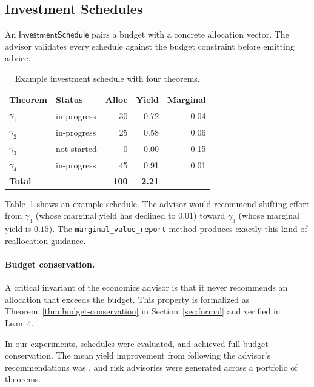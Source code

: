 \documentclass[11pt]{article}
\begin{document}
\subsection{Investment Schedules}\label{sec:schedules}

An $\mathsf{InvestmentSchedule}$ pairs a budget with a concrete
allocation vector.  The advisor validates every schedule against
the budget constraint before emitting advice.

\begin{table}[t]
\centering
\caption{Example investment schedule with four theorems.}
\label{tab:schedule-example}
\begin{tabular}{llrrr}
\hline
\textbf{Theorem} & \textbf{Status} & \textbf{Alloc} &
  \textbf{Yield} & \textbf{Marginal} \\
\hline
$\gamma_1$ & in-progress & 30 & 0.72 & 0.04 \\
$\gamma_2$ & in-progress & 25 & 0.58 & 0.06 \\
$\gamma_3$ & not-started & 0  & 0.00 & 0.15 \\
$\gamma_4$ & in-progress & 45 & 0.91 & 0.01 \\
\hline
\textbf{Total} & & \textbf{100} & \textbf{2.21} & \\
\hline
\end{tabular}
\end{table}

Table~\ref{tab:schedule-example} shows an example schedule.  The
advisor would recommend shifting effort from $\gamma_4$ (whose
marginal yield has declined to $0.01$) toward $\gamma_3$ (whose
marginal yield is $0.15$).  The \texttt{marginal\_value\_report}
method produces exactly this kind of reallocation guidance.

\paragraph{Budget conservation.}
A critical invariant of the economics advisor is that it never
recommends an allocation that exceeds the budget.  This property
is formalized as Theorem~\ref{thm:budget-conservation} in
Section~\ref{sec:formal} and verified in Lean~4.

In our experiments, \ppXCIallocationsAdvised{} schedules were
evaluated, and \ppXCIbudgetConserved{} achieved full budget
conservation.  The mean yield improvement from following the
advisor's recommendations was \ppXCImeanYieldImprovement{}, and
\ppXCIriskAdvisories{} risk advisories were generated across a
portfolio of \ppXCIportfolioSize{} theorems.
\end{document}
